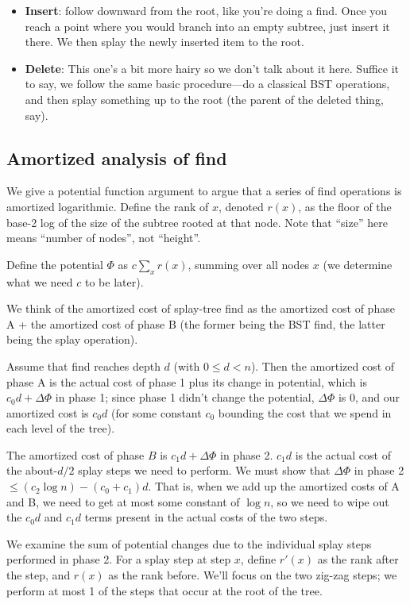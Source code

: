 \documentclass{article}
\begin{document}
\begin{itemize}
	\item
	\textbf{Insert}: follow downward from the root, like you're doing a find.
	Once you reach a point where you would branch into an empty subtree,
	just insert it there.
	We then splay the newly inserted item to the root.
	
	\item
	\textbf{Delete}: This one's a bit more hairy so we don't talk about it
	here. Suffice it to say, we follow the same basic procedure---do a
	classical BST operations, and then splay something up to the root
	(the parent of the deleted thing, say).
\end{itemize}


\subsection{Amortized analysis of find}

We give a potential function argument to argue that a series of find
operations is amortized logarithmic.
Define the rank of $x$, denoted $r(x)$, as the floor of the base-2 log
of the size of the subtree rooted at that node.
Note that ``size'' here means ``number of nodes'', not ``height''.

Define the potential $\Phi$ as $c\sum_x r(x)$, summing over all nodes $x$
(we determine what we need $c$ to be later).

We think of the amortized cost of splay-tree find as the amortized cost
of phase A + the amortized cost of phase B (the former being the BST find,
the latter being the splay operation).

Assume that find reaches depth $d$ (with $0\leq d < n$).
Then the amortized cost of phase A is the actual cost of phase 1 plus its
change in potential, which is $c_0d + \Delta\Phi$ in phase 1; since phase
1 didn't change the potential, $\Delta\Phi$ is 0, and our amortized cost
is $c_0 d$ (for some constant $c_0$ bounding the cost that we
spend in each level of the tree).

The amortized cost of phase $B$ is $c_1 d + \Delta\Phi$ in phase 2.
$c_1 d$ is the actual cost of the about-$d/2$ splay steps we need to perform.
We must show that $\Delta\Phi$ in phase 2 $\leq (c_2\log n) - (c_0 + c_1)d$.
That is, when we add up the amortized costs of A and B, we need to get
at most some constant of $\log n$, so we need to wipe out the $c_0 d$ and
$c_1 d$ terms present in the actual costs of the two steps.

We examine the sum of potential changes due to the individual splay steps
performed in phase 2.
For a splay step at step $x$, define $r'(x)$ as the rank after the step,
and $r(x)$ as the rank before.
We'll focus on the two zig-zag steps; we perform at most 1 of the steps
that occur at the root of the tree.
\end{document}
